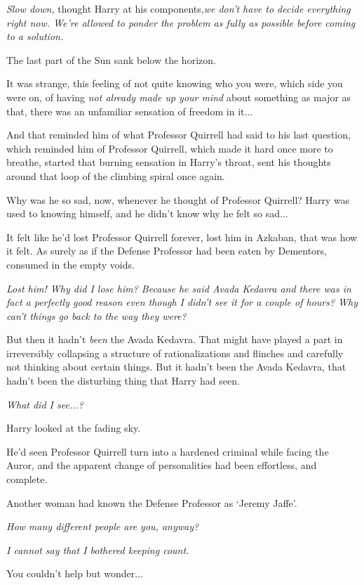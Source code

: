 \emph{Slow down,} thought Harry at his components,\emph{we don't have to
decide everything right now. We're allowed to ponder the problem as
fully as possible before coming to a solution.}

The last part of the Sun sank below the horizon.

It was strange, this feeling of not quite knowing who you were, which
side you were on, of having \emph{not already made up your mind} about
something as major as that, there was an unfamiliar sensation of freedom
in it...

And that reminded him of what Professor Quirrell had said to his last
question, which reminded him of Professor Quirrell, which made it hard
once more to breathe, started that burning sensation in Harry's throat,
sent his thoughts around that loop of the climbing spiral once again.

Why was he so sad, now, whenever he thought of Professor Quirrell? Harry
was used to knowing himself, and he didn't know why he felt so
sad...

It felt like he'd lost Professor Quirrell forever, lost him in Azkaban,
that was how it felt. As surely as if the Defense Professor had been
eaten by Dementors, consumed in the empty voids.

\emph{Lost him! Why did I lose him? Because he said Avada Kedavra and
there was in fact a perfectly good reason even though I didn't see it
for a couple of hours? Why can't things go back to the way they were?}

But then it hadn't \emph{been} the Avada Kedavra. That might have played
a part in irreversibly collapsing a structure of rationalizations and
flinches and carefully not thinking about certain things. But it hadn't
been the Avada Kedavra, that hadn't been the disturbing thing that Harry
had seen.

\emph{What did I see...?}

Harry looked at the fading sky.

He'd seen Professor Quirrell turn into a hardened criminal while facing
the Auror, and the apparent change of personalities had been effortless,
and complete.

Another woman had known the Defense Professor as `Jeremy Jaffe'.

\emph{How many different people are you, anyway?}

\emph{I cannot say that I bothered keeping count.}

You couldn't help but wonder...

